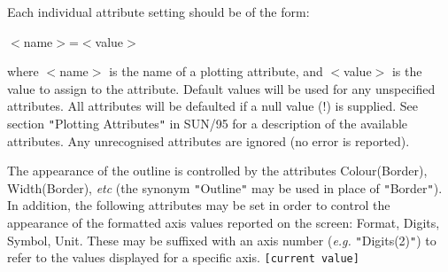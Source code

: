 \documentclass[twoside,11pt,nolof]{starlink}
\begin{document}
{{{         Each individual attribute setting should be of the form:

            $<$name$>$=$<$value$>$

         where $<$name$>$ is the name of a plotting attribute, and $<$value$>$ is
         the value to assign to the attribute. Default values will be
         used for any unspecified attributes. All attributes will be
         defaulted if a null value (!) is supplied. See section \texttt{"}Plotting
         Attributes\texttt{"} in SUN/95 for a description of the available
         attributes. Any unrecognised attributes are ignored (no error is
         reported).

         The appearance of the outline is controlled by the attributes
         Colour(Border), Width(Border), \emph{etc} (the synonym \texttt{"}Outline\texttt{"} may be
         used in place of \texttt{"}Border\texttt{"}). In addition, the following attributes
         may be set in order to control the appearance of the formatted axis
         values reported on the screen: Format, Digits, Symbol, Unit. These
         may be suffixed with an axis number (\emph{e.g.} \texttt{"}Digits(2)\texttt{"}) to refer to
         the values displayed for a specific axis. \texttt{[current value]}
      }
   }
   }
\end{document}
